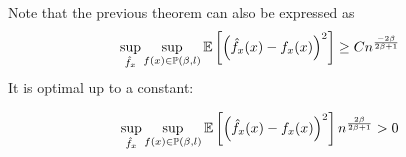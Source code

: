 \documentclass{article}
\begin{document}
\begin{remark}
    Note that the previous theorem can also be expressed as \[ 
    \sup_{\hat{f}_x} \sup_{f(x) \in \mathbb{P}(\beta , l)} \mathbb{E} \left[ \left(\hat{f}_{x}(x)-f_{x}(x)\right)^{2}\right] \geq C n^{\frac{-2\beta}{2\beta+1}}
    \]
    It is optimal up to a constant: 


    \[
    \sup_{\hat{f}_x} \sup_{f(x) \in \mathbb{P}(\beta , l)} \mathbb{E} \left[ \left(\hat{f}_{x}(x)-f_{x}(x)\right)^{2}\right] n^{\frac{2\beta}{2\beta+1}} > 0 
    \]
\end{remark}
\end{document}
